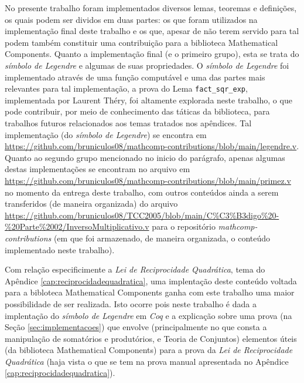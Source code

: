No presente trabalho foram implementados diversos lemas, teoremas e definições, os quais podem ser dividos em duas partes: os que foram utilizados na implementação final deste trabalho e os que, apesar de não terem servido para tal podem também constituir uma contribuição para a biblioteca Mathematical Components. 
Quanto a implementação final (e o primeiro grupo), esta se trata do \textit{símbolo de Legendre} e algumas de suas propriedades. O \textit{símbolo de Legendre} foi implementado através de uma função computável e uma das partes mais relevantes para tal implementação, a prova do Lema \lstinline[language=coq]|fact_sqr_exp|, implementada por Laurent Théry, foi altamente explorada neste trabalho, o que pode contribuir, por meio de conhecimento das táticas da biblioteca, para trabalhos futuros relacionados aos temas tratados nos apêndices. Tal implementação (do \textit{símbolo de Legendre}) se encontra em \url{https://github.com/bruniculos08/mathcomp-contributions/blob/main/legendre.v}. Quanto ao segundo grupo mencionado no inicio do parágrafo, apenas algumas destas implementações se encontram no arquivo em \url{https://github.com/bruniculos08/mathcomp-contributions/blob/main/primez.v} no momento da entrega deste trabalho, com outros conteúdos ainda a serem transferidos (de maneira organizada) do arquivo \url{https://github.com/bruniculos08/TCC2005/blob/main/C\%C3\%B3digo\%20-\%20Parte\%2002/InversoMultiplicativo.v} para o repositório \textit{mathcomp-contributions} (em que foi armazenado, de maneira organizada, o conteúdo implementado neste trabalho). 

Com relação especificimente a \textit{Lei de Reciprocidade Quadrática}, tema do Apêndice \ref{cap:reciprocidadequadratica}, uma implentação deste conteúdo voltada para a bibloteca Mathematical Components ganha com este trabalho uma maior possibilidade de ser realizada. Isto ocorre pois neste trabalho é dada a implentação do \textit{símbolo de Legendre} em \textit{Coq} e a explicação sobre uma prova (na Seção \ref{sec:implementacoes}) que envolve (principalmente no que consta a manipulação de somatórios e produtórios, e Teoria de Conjuntos) elementos úteis (da biblioteca Mathematical Components) para a prova da \textit{Lei de Reciprocidade Quadrática} (haja vista o que se tem na prova manual apresentada no Apêndice \ref{cap:reciprocidadequadratica}).

